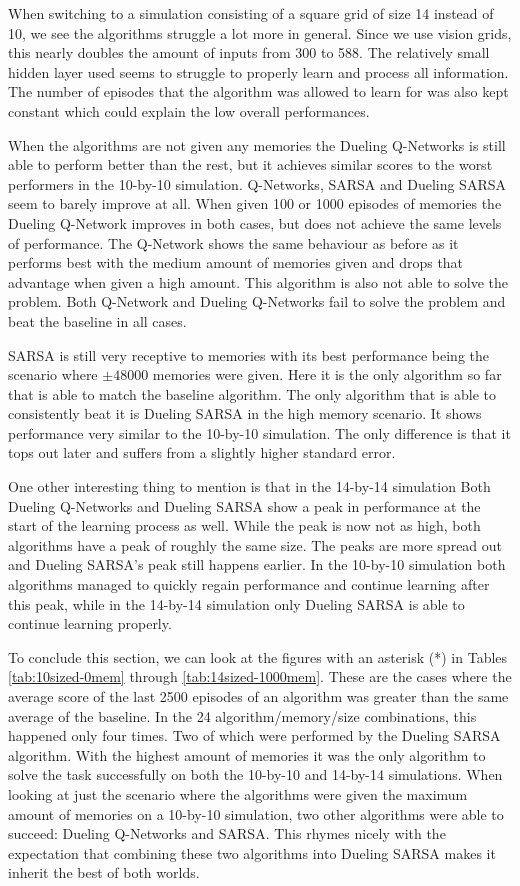 When switching to a simulation consisting of a square grid of size 14 instead of 10, we see the algorithms struggle a lot more in general. Since we use vision grids, this nearly doubles the amount of inputs from 300 to 588. The relatively small hidden layer used seems to struggle to properly learn and process all information. The number of episodes that the algorithm was allowed to learn for was also kept constant which could explain the low overall performances.

When the algorithms are not given any memories the Dueling Q-Networks is still able to perform better than the rest, but it achieves similar scores to the worst performers in the 10-by-10 simulation. Q-Networks, SARSA and Dueling SARSA seem to barely improve at all. When given 100 or 1000 episodes of memories the Dueling Q-Network improves in both cases, but does not achieve the same levels of performance. The Q-Network shows the same behaviour as before as it performs best with the medium amount of memories given and drops that advantage when given a high amount. This algorithm is also not able to solve the problem. Both Q-Network and Dueling Q-Networks fail to solve the problem and beat the baseline in all cases.

SARSA is still very receptive to memories with its best performance being the scenario where $\pm 48000$ memories were given. Here it is the only algorithm so far that is able to match the baseline algorithm. The only algorithm that is able to consistently beat it is Dueling SARSA in the high memory scenario. It shows performance very similar to the 10-by-10 simulation. The only difference is that it tops out later and suffers from a slightly higher standard error.

One other interesting thing to mention is that in the 14-by-14 simulation Both Dueling Q-Networks and Dueling SARSA show a peak in performance at the start of the learning process as well. While the peak is now not as high, both algorithms have a peak of roughly the same size. The peaks are more spread out and Dueling SARSA's peak still happens earlier. In the 10-by-10 simulation both algorithms managed to quickly regain performance and continue learning after this peak, while in the 14-by-14 simulation only Dueling SARSA is able to continue learning properly.

To conclude this section, we can look at the figures with an asterisk (*) in Tables \ref{tab:10sized-0mem} through \ref{tab:14sized-1000mem}. These are the cases where the average score of the last 2500 episodes of an algorithm was greater than the same average of the baseline. In the 24 algorithm/memory/size combinations, this happened only four times. Two of which were performed by the Dueling SARSA algorithm. With the highest amount of memories it was the only algorithm to solve the task successfully on both the 10-by-10 and 14-by-14 simulations. When looking at just the scenario where the algorithms were given the maximum amount of memories on a 10-by-10 simulation, two other algorithms were able to succeed: Dueling Q-Networks and SARSA. This rhymes nicely with the expectation that combining these two algorithms into Dueling SARSA makes it inherit the best of both worlds.